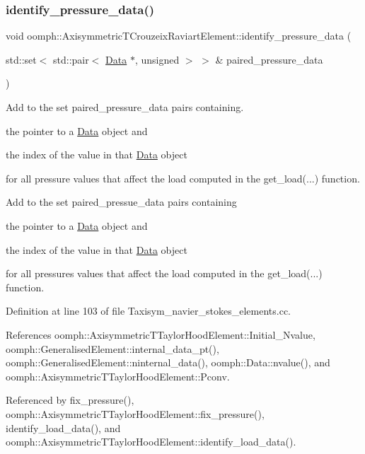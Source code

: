 \subsubsection{\texorpdfstring{identify\+\_\+pressure\+\_\+data()}{identify\_pressure\_data()}}
{\footnotesize\ttfamily void oomph\+::\+Axisymmetric\+T\+Crouzeix\+Raviart\+Element\+::identify\+\_\+pressure\+\_\+data (\begin{DoxyParamCaption}\item[{std\+::set$<$ std\+::pair$<$ \hyperlink{classoomph_1_1Data}{Data} $\ast$, unsigned $>$ $>$ \&}]{paired\+\_\+pressure\+\_\+data }\end{DoxyParamCaption})}



Add to the set {\ttfamily paired\+\_\+pressure\+\_\+data} pairs containing. 


\begin{DoxyItemize}
\item the pointer to a \hyperlink{classoomph_1_1Data}{Data} object and
\item the index of the value in that \hyperlink{classoomph_1_1Data}{Data} object
\end{DoxyItemize}for all pressure values that affect the load computed in the {\ttfamily get\+\_\+load}(...) function.

Add to the set {\ttfamily paired\+\_\+pressue\+\_\+data} pairs containing
\begin{DoxyItemize}
\item the pointer to a \hyperlink{classoomph_1_1Data}{Data} object and
\item the index of the value in that \hyperlink{classoomph_1_1Data}{Data} object
\end{DoxyItemize}for all pressures values that affect the load computed in the {\ttfamily get\+\_\+load}(...) function. 

Definition at line 103 of file Taxisym\+\_\+navier\+\_\+stokes\+\_\+elements.\+cc.



References oomph\+::\+Axisymmetric\+T\+Taylor\+Hood\+Element\+::\+Initial\+\_\+\+Nvalue, oomph\+::\+Generalised\+Element\+::internal\+\_\+data\+\_\+pt(), oomph\+::\+Generalised\+Element\+::ninternal\+\_\+data(), oomph\+::\+Data\+::nvalue(), and oomph\+::\+Axisymmetric\+T\+Taylor\+Hood\+Element\+::\+Pconv.



Referenced by fix\+\_\+pressure(), oomph\+::\+Axisymmetric\+T\+Taylor\+Hood\+Element\+::fix\+\_\+pressure(), identify\+\_\+load\+\_\+data(), and oomph\+::\+Axisymmetric\+T\+Taylor\+Hood\+Element\+::identify\+\_\+load\+\_\+data().

